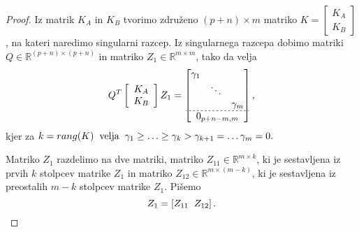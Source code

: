 \documentclass[mat1]{article}
\begin{document}
\begin{proof}

Iz matrik $K_A$ in $K_B$ tvorimo združeno $(p+n)\times m$ matriko $K = \left[\begin{array}{c} K_A \\ K_B \end{array}\right]$, na kateri naredimo singularni razcep. Iz singularnega razcepa dobimo matriki $Q \in \mathbb{R}^{(p+n) \times (p+n)}$ in matriko $Z_1 \in \mathbb{R}^{m \times m}$, tako da velja 
\begin{equation}
Q^T \left[\begin{array}{c} K_A \\ K_B \end{array}\right] Z_1 = 
\begin{bmatrix}
\begin{matrix}
\gamma_1 & & \\
 & \ddots & \\
 & & \gamma_m
\end{matrix} \\ \hdashline[2pt/2pt]
0_{p+n-m, m}
\end{bmatrix} 
\text{,}
\label{eq:1}
\end{equation}
kjer za
$
k = rang(K) \hspace{2mm} \text{velja} \hspace{2mm} 
\gamma_1 \geq \ldots \geq \gamma_k > \gamma_{k+1} = \ldots \gamma_m = 0\text{.} $

Matriko $Z_1$ razdelimo na dve matriki, matriko $Z_{11} \in \mathbb{R}^{m \times k}$, ki je sestavljena iz prvih $k$ stolpcev matrike $Z_1$ in matriko $Z_{12} \in \mathbb{R}^{m \times (m-k)}$, ki je sestavljena iz preostalih $m-k$ stolpcev matrike $Z_1$. Pišemo $$Z_1 = \left[ Z_{11} \hspace{2mm} Z_{12} \right] \text{.}$$


\end{proof}
\end{document}
